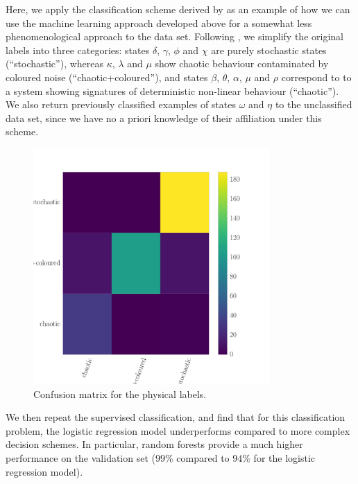 \documentclass[12pt]{emulateapj}
\begin{document}
Here, we apply the classification scheme derived by \citet{harikrishnan2011} as an example of how we can use the machine learning approach developed above 
for a somewhat less phenomenological approach to the data set. 
Following \citet{harikrishnan2011}, we simplify the original labels into three categories: states $\delta$, $\gamma$, $\phi$ and $\chi$ are purely stochastic states
(``stochastic''), whereas $\kappa$, $\lambda$ and $\mu$ show chaotic behaviour contaminated by coloured noise (``chaotic+coloured''), and states $\beta$, $\theta$, $\alpha$, $\mu$ and $\rho$ correspond to to a system showing signatures of deterministic non-linear behaviour (``chaotic'').
We also return previously classified examples of states $\omega$ and $\eta$ to the unclassified data set, since we have no a priori knowledge of their affiliation under this scheme.
\begin{figure}[htbp]
\begin{center}
\includegraphics[width=9cm]{grs1915_supervised_phys_cm.pdf}
\caption{Confusion matrix for the physical labels.} 
\label{fig:confusionmatrix_physical}
\end{center}
\end{figure}
We then repeat the supervised classification, and find that for this classification problem, the logistic regression model underperforms compared to more complex decision schemes. In particular, random forests provide a much higher performance on the validation set ($99\%$ compared to $94\%$ for the logistic regression model). 
\end{document}
